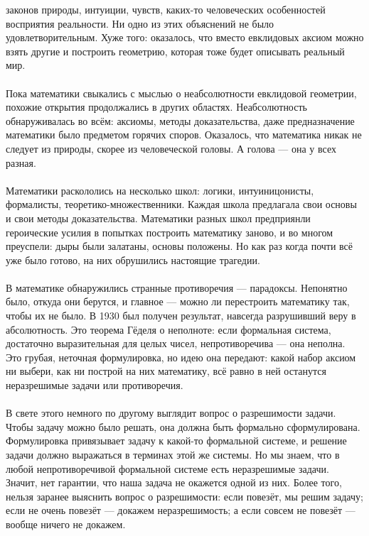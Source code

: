 \documentclass[11pt]{book}
\begin{document}
законов природы, интуиции, чувств, каких-то человеческих особенностей восприятия реальности.
Ни одно из этих объяснений не было удовлетворительным.
Хуже того: оказалось, что вместо евклидовых аксиом можно взять другие и построить геометрию, которая тоже будет описывать реальный мир.
\\ \\
Пока математики свыкались с мыслью о неабсолютности евклидовой геометрии, похожие открытия продолжались в других областях.
Неабсолютность обнаруживалась во всём: аксиомы, методы доказательства, даже предназначение математики было предметом горячих споров.
Оказалось, что математика никак не следует из природы, скорее из человеческой головы.
А голова --- она у всех разная.
\\ \\
Математики раскололись на несколько школ: логики, интуиницонисты, формалисты, теоретико-множественники.
Каждая школа предлагала свои основы и свои методы доказательства.
Математики разных школ предприянли героические усилия в попытках построить математику заново,
и во многом преуспели: дыры были залатаны, основы положены.
Но как раз когда почти всё уже было готово, на них обрушились настоящие трагедии.
\\ \\
В математике обнаружились странные противоречия --- парадоксы.
Непонятно было, откуда они берутся, и главное --- можно ли перестроить математику так, чтобы их не было.
В 1930 был получен результат, навсегда разрушивший веру в абсолютность.
Это теорема Гёделя о неполноте: если формальная система, достаточно выразительная для целых чисел, непротиворечива --- она неполна.
Это грубая, неточная формулировка, но идею она передают: какой набор аксиом ни выбери, как ни построй на них математику,
всё равно в ней останутся неразрешимые задачи или противоречия.
\\ \\
В свете этого немного по другому выглядит вопрос о разрешимости задачи.
Чтобы задачу можно было решать, она должна быть формально сформулирована.
Формулировка привязывает задачу к какой-то формальной системе, и решение задачи должно выражаться в терминах этой же системы.
Но мы знаем, что в любой непротиворечивой формальной системе есть неразрешимые задачи.
Значит, нет гарантии, что наша задача не окажется одной из них.
Более того, нельзя заранее выяснить вопрос о разрешимости: если повезёт, мы решим задачу;
если не очень повезёт --- докажем неразрешимость; а если совсем не повезёт --- вообще ничего не докажем.
\\ \\
\end{document}
